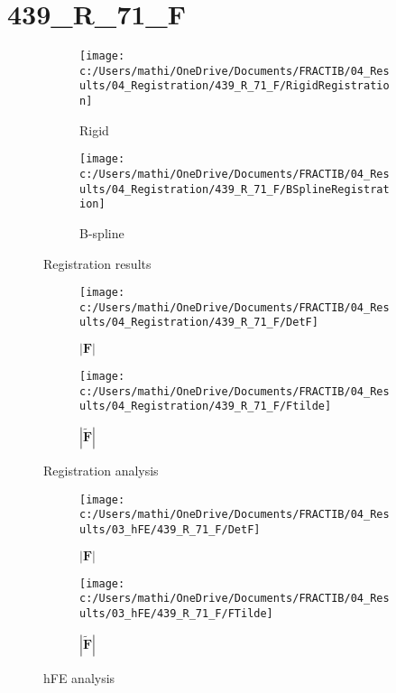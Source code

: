\documentclass{article}%
\begin{document}
%
\newpage%
\section*{439\_R\_71\_F}%
\label{sec:439R71F}%


\begin{figure}[h!]%
\begin{subfigure}[b]{0.5\linewidth}%
\texttt{[image: c:/Users/mathi/OneDrive/Documents/FRACTIB/04\_Results/04\_Registration/439\_R\_71\_F/RigidRegistration]}%
\caption{Rigid}%
\end{subfigure}%
\begin{subfigure}[b]{0.5\linewidth}%
\texttt{[image: c:/Users/mathi/OneDrive/Documents/FRACTIB/04\_Results/04\_Registration/439\_R\_71\_F/BSplineRegistration]}%
\caption{B{-}spline}%
\end{subfigure}%
\caption{Registration results}%
\end{figure}

%


\begin{figure}[h!]%
\begin{subfigure}[b]{0.5\linewidth}%
\texttt{[image: c:/Users/mathi/OneDrive/Documents/FRACTIB/04\_Results/04\_Registration/439\_R\_71\_F/DetF]}%
\caption{$|\mathbf{F}|$}%
\end{subfigure}%
\begin{subfigure}[b]{0.5\linewidth}%
\texttt{[image: c:/Users/mathi/OneDrive/Documents/FRACTIB/04\_Results/04\_Registration/439\_R\_71\_F/Ftilde]}%
\caption{$|\widetilde{\mathbf{F}}|$}%
\end{subfigure}%
\caption{Registration analysis}%
\end{figure}

%


\begin{figure}[h!]%
\begin{subfigure}[b]{0.5\linewidth}%
\texttt{[image: c:/Users/mathi/OneDrive/Documents/FRACTIB/04\_Results/03\_hFE/439\_R\_71\_F/DetF]}%
\caption{$|\mathbf{F}|$}%
\end{subfigure}%
\begin{subfigure}[b]{0.5\linewidth}%
\texttt{[image: c:/Users/mathi/OneDrive/Documents/FRACTIB/04\_Results/03\_hFE/439\_R\_71\_F/FTilde]}%
\caption{$|\widetilde{\mathbf{F}}|$}%
\end{subfigure}%
\caption{hFE analysis}%
\end{figure}
\end{document}

